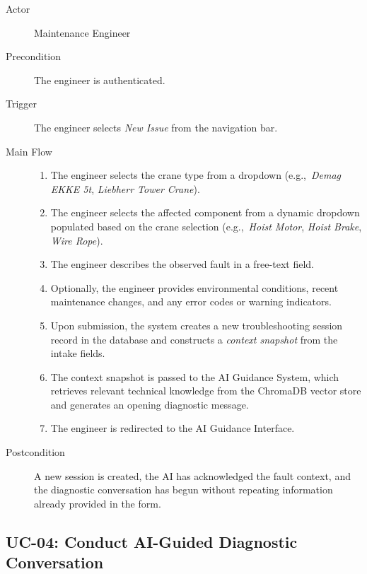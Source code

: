 \begin{description}
    \item[Actor] Maintenance Engineer
    \item[Precondition] The engineer is authenticated.
    \item[Trigger] The engineer selects \textit{New Issue} from the navigation bar.
    \item[Main Flow]
        \begin{enumerate}[noitemsep]
            \item The engineer selects the crane type from a dropdown
                  (e.g.,~\textit{Demag EKKE 5t}, \textit{Liebherr Tower Crane}).
            \item The engineer selects the affected component from a dynamic dropdown
                  populated based on the crane selection
                  (e.g.,~\textit{Hoist Motor}, \textit{Hoist Brake}, \textit{Wire Rope}).
            \item The engineer describes the observed fault in a free-text field.
            \item Optionally, the engineer provides environmental conditions, recent
                  maintenance changes, and any error codes or warning indicators.
            \item Upon submission, the system creates a new troubleshooting session record
                  in the database and constructs a \textit{context snapshot} from the
                  intake fields.
            \item The context snapshot is passed to the AI Guidance System, which
                  retrieves relevant technical knowledge from the ChromaDB vector store
                  and generates an opening diagnostic message.
            \item The engineer is redirected to the AI Guidance Interface.
        \end{enumerate}
    \item[Postcondition]
        A new session is created, the AI has acknowledged the fault context, and
        the diagnostic conversation has begun without repeating information already
        provided in the form.
\end{description}

\subsection{UC-04: Conduct AI-Guided Diagnostic Conversation\label{sec:uc04}}

